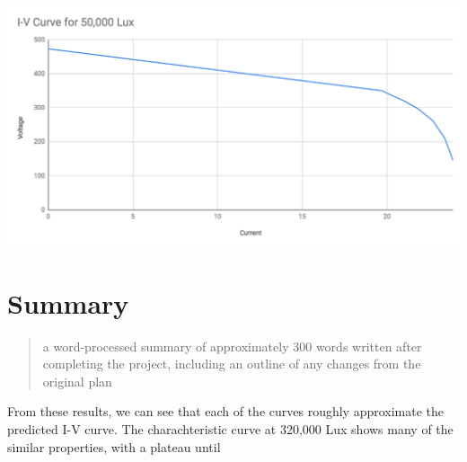 \documentclass{article}
\begin{document}
\\
\includegraphics[scale=0.4]{ivcurve3}

\section{Summary}
\begin{quote}
  a word-processed summary of approximately 300 words written after completing the project, including an outline of any changes from the original plan
\end{quote}


From these results, we can see that each of the curves roughly approximate the predicted I-V curve. The charachteristic curve at 320,000 Lux shows many of the similar properties, with a plateau until 
\end{document}
